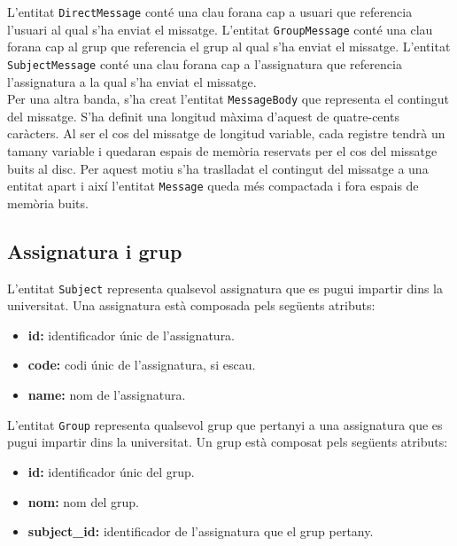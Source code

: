    	L'entitat \texttt{DirectMessage} conté una clau forana cap a usuari que referencia l'usuari al qual s'ha enviat el missatge.	L'entitat \texttt{GroupMessage} conté una clau forana cap al grup que referencia el grup al qual s'ha enviat el missatge.	L'entitat \texttt{SubjectMessage} conté una clau forana cap a l'assignatura que referencia l'assignatura a la qual s'ha enviat el missatge.\\
   
   	Per una altra banda, s'ha creat l'entitat \texttt{MessageBody} que representa el contingut del missatge. S'ha definit una longitud màxima d'aquest de quatre-cents caràcters. Al ser el cos del missatge de longitud variable, cada registre tendrà un tamany variable i quedaran espais de memòria reservats per el cos del missatge buits al disc. Per aquest motiu s'ha traslladat el contingut del missatge a una entitat apart i així l'entitat \texttt{Message} queda més compactada i fora espais de memòria buits.\\
   	
   	\subsection{Assignatura i grup}
   	
   	L'entitat \texttt{Subject} representa qualsevol assignatura que es pugui impartir dins la universitat. Una assignatura està composada pels següents atributs:
   	
   	\begin{itemize}
   		\item \textbf{id:} identificador únic de l'assignatura.
   		\item \textbf{code:} codi únic de l'assignatura, si escau.
   		\item \textbf{name:} nom de l'assignatura.
   	\end{itemize}
   	
   	L'entitat \texttt{Group} representa qualsevol grup que pertanyi a una assignatura que es pugui impartir dins la universitat. Un grup està composat pels següents atributs:
   	
   	\begin{itemize}
   		\item \textbf{id:} identificador únic del grup.
   		\item \textbf{nom:} nom del grup.
   		\item \textbf{subject\_id:} identificador de l'assignatura que el grup pertany. 
   	\end{itemize}
   	
